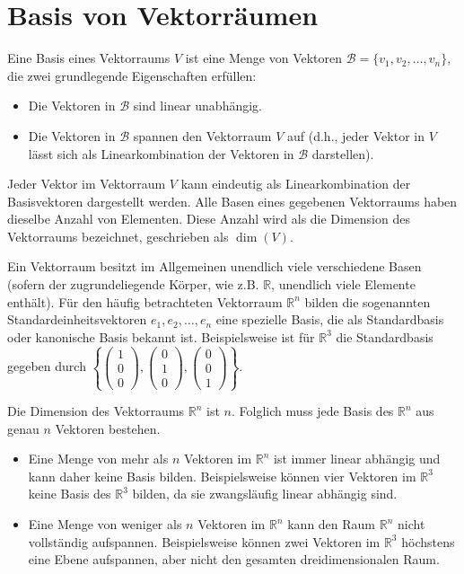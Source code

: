 \chapter{Basis von Vektorräumen}

Eine Basis eines Vektorraums $V$ ist eine Menge von Vektoren $\mathcal{B} = \{v_1, v_2, \dots, v_n\}$, die zwei grundlegende Eigenschaften erfüllen:
\begin{itemize}
    \item Die Vektoren in $\mathcal{B}$ sind linear unabhängig.
    \item Die Vektoren in $\mathcal{B}$ spannen den Vektorraum $V$ auf (d.h., jeder Vektor in $V$ lässt sich als Linearkombination der Vektoren in $\mathcal{B}$ darstellen).
\end{itemize}
Jeder Vektor im Vektorraum $V$ kann eindeutig als Linearkombination der Basisvektoren dargestellt werden. Alle Basen eines gegebenen Vektorraums haben dieselbe Anzahl von Elementen. Diese Anzahl wird als die Dimension des Vektorraums bezeichnet, geschrieben als $\dim(V)$.

Ein Vektorraum besitzt im Allgemeinen unendlich viele verschiedene Basen (sofern der zugrundeliegende Körper, wie z.B. $\mathbb{R}$, unendlich viele Elemente enthält).
Für den häufig betrachteten Vektorraum $\mathbb{R}^n$ bilden die sogenannten Standardeinheitsvektoren $e_1, e_2, \dots, e_n$ eine spezielle Basis, die als Standardbasis oder kanonische Basis bekannt ist. Beispielsweise ist für $\mathbb{R}^3$ die Standardbasis gegeben durch $\left\{\begin{pmatrix} 1 \\ 0 \\ 0 \end{pmatrix}, \begin{pmatrix} 0 \\ 1 \\ 0 \end{pmatrix}, \begin{pmatrix} 0 \\ 0 \\ 1 \end{pmatrix}\right\}$.

Die Dimension des Vektorraums $\mathbb{R}^n$ ist $n$. Folglich muss jede Basis des $\mathbb{R}^n$ aus genau $n$ Vektoren bestehen.
\begin{itemize}
    \item Eine Menge von mehr als $n$ Vektoren im $\mathbb{R}^n$ ist immer linear abhängig und kann daher keine Basis bilden. Beispielsweise können vier Vektoren im $\mathbb{R}^3$ keine Basis des $\mathbb{R}^3$ bilden, da sie zwangsläufig linear abhängig sind.
    \item Eine Menge von weniger als $n$ Vektoren im $\mathbb{R}^n$ kann den Raum $\mathbb{R}^n$ nicht vollständig aufspannen. Beispielsweise können zwei Vektoren im $\mathbb{R}^3$ höchstens eine Ebene aufspannen, aber nicht den gesamten dreidimensionalen Raum.
\end{itemize}

